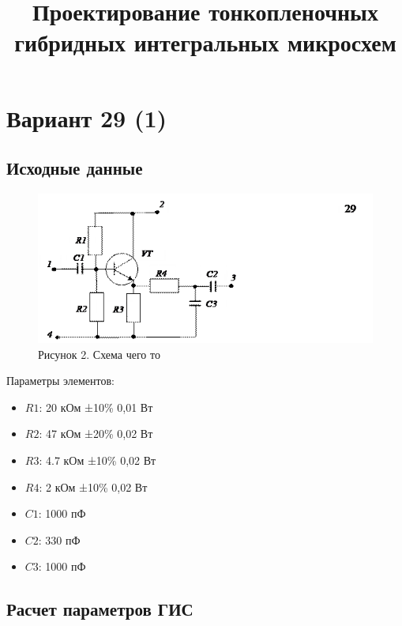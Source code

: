 \documentclass[
]{article}
\title{Проектирование тонкопленочных гибридных интегральных микросхем}
\author{}
\date{\vspace{-2.5em}}
\providecommand{\tightlist}{%
  \setlength{\itemsep}{0pt}\setlength{\parskip}{0pt}}
\begin{document}
\maketitle

\section{Вариант 29 (1)}\label{ux432ux430ux440ux438ux430ux43dux442-29-1}

\subsection{Исходные
данные}\label{ux438ux441ux445ux43eux434ux43dux44bux435-ux434ux430ux43dux43dux44bux435}

\begin{figure}
\centering
\includegraphics{HW1/Circut2.gif}
\caption{Рисунок 2. Схема чего то}
\end{figure}

Параметры элементов:

\begin{itemize}
\tightlist
\item
  \(R1\): 20 кОм ±10\% 0,01 Вт
\item
  \(R2\): 47 кОм ±20\% 0,02 Вт
\item
  \(R3\): 4.7 кОм ±10\% 0,02 Вт
\item
  \(R4\): 2 кОм ±10\% 0,02 Вт
\item
  \(C1\): 1000 пФ
\item
  \(C2\): 330 пФ
\item
  \(C3\): 1000 пФ
\end{itemize}

\subsection{Расчет параметров
ГИС}\label{ux440ux430ux441ux447ux435ux442-ux43fux430ux440ux430ux43cux435ux442ux440ux43eux432-ux433ux438ux441}
\end{document}
